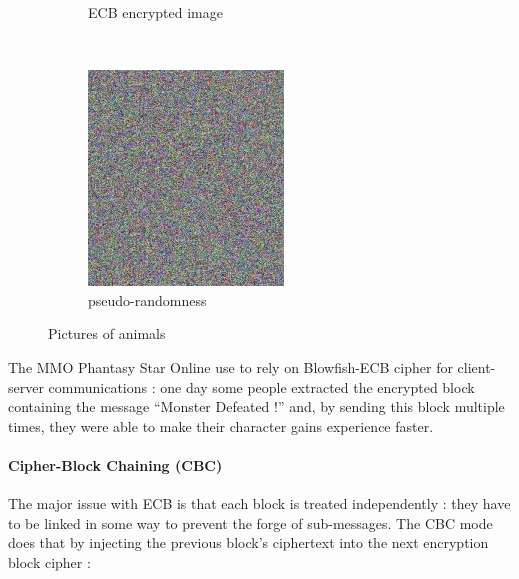 \begin{figure}[h!]
\begin{subfigure}[c]{0.27\textwidth}
                \caption{ECB encrypted image}
                \label{fig:ECB_Exemple_encrypted}
        \end{subfigure}
		~		        
        \begin{subfigure}[c]{0.27\textwidth}
                \centering
                \includegraphics[width=\textwidth]{images/Tux_secure.jpg}
                \caption{  pseudo-randomness }
                \label{fig:ECB_Exemple_objectif}
        \end{subfigure}
        \caption{Pictures of animals}\label{fig:ECB_flaw}
\end{figure}

The MMO Phantasy Star Online use to rely on Blowfish-ECB cipher for client-server communications : one day some people extracted the encrypted block containing the message ``Monster Defeated !'' and, by sending this block multiple times, they were able to make their character gains experience faster.

\paragraph{ Cipher-Block Chaining (CBC) }

The major issue with ECB is that each block is treated independently : they have to be linked in some way to prevent the forge of sub-messages. The CBC mode does that by injecting the previous block's ciphertext into the next encryption block cipher : 

